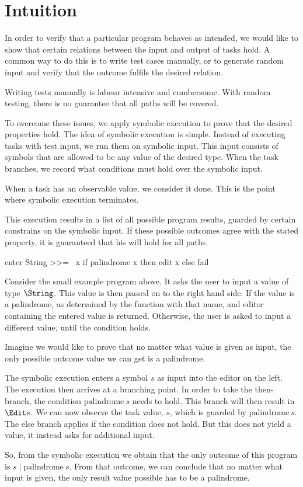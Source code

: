 


\section{Intuition}
\label{sec:intuition}

In order to verify that a particular \TOPHAT program behaves as intended,
we would like to show that certain relations between the input and output of tasks hold.
A common way to do this is to write test cases manually,
or to generate random input and verify that the outcome fulfils the desired relation.

Writing tests manually is labour intensive and cumbersome.
With random testing, there is no guarantee that all paths will be covered.

To overcome these issues, we apply symbolic execution to prove that the desired properties hold.
The idea of symbolic execution is simple.
Instead of executing tasks with test input, we run them on symbolic input.
This input consists of symbols that are allowed to be any value of the desired type.
When the task branches, we record what conditions must hold over the symbolic input.

When a task has an observable value, we consider it done.
This is the point where symbolic execution terminates.

This execution results in a list of all possible program results,
guarded by certain constrains on the symbolic input.
If these possible outcomes agree with the stated property,
it is guaranteed that his will hold for all paths.

\begin{example}
  \begin{TASK}
    enter String >>= \ x if palindrome x then edit x else fail
\end{TASK}
\end{example}

Consider the small example program above.
It asks the user to input a value of type $\String$.
This value is then passed on to the right hand side.
If the value is a palindrome, as determined by the function with that name,
and editor containing the entered value is returned.
Otherwise, the user is asked to input a different value, until the condition holds.

Imagine we would like to prove that no matter what value is given as input,
the only possible outcome value we can get is a palindrome.

The symbolic execution enters a symbol $s$ as input into the editor on the left.
The execution then arrives at a branching point.
In order to take the then-branch, the condition $\text{palindrome}\ s$ needs to hold.
This branch will then result in $\Edit s$.
We can now observe the task value, $s$, which is guarded by $\text{palindrome}\ s$.
The else branch applies if the condition does not hold.
But this does not yield a value, it instead asks for additional input.

So, from the symbolic execution we obtain that the only outcome of this program is $s \mid \text{palindrome}\ s$.
From that outcome, we can conclude that no matter what input is given, the only result value possible has to be a palindrome.
